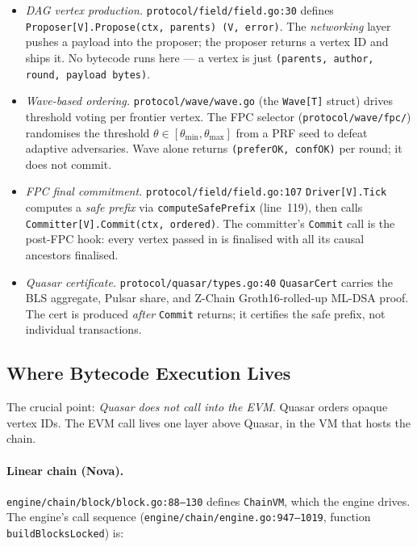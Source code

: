\begin{itemize}
  \item \emph{DAG vertex production.} \texttt{protocol/field/field.go:30}
    defines \texttt{Proposer[V].Propose(ctx, parents) (V, error)}. The
    \emph{networking} layer pushes a payload into the proposer; the
    proposer returns a vertex ID and ships it. No bytecode runs here ---
    a vertex is just \texttt{(parents, author, round, payload bytes)}.
  \item \emph{Wave-based ordering.} \texttt{protocol/wave/wave.go} (the
    \texttt{Wave[T]} struct) drives threshold voting per frontier vertex.
    The FPC selector (\texttt{protocol/wave/fpc/}) randomises the
    threshold $\theta \in [\theta_{\min}, \theta_{\max}]$ from a PRF seed
    to defeat adaptive adversaries. Wave alone returns
    \texttt{(preferOK, confOK)} per round; it does not commit.
  \item \emph{FPC final commitment.} \texttt{protocol/field/field.go:107}
    \texttt{Driver[V].Tick} computes a \emph{safe prefix} via
    \texttt{computeSafePrefix} (line~119), then calls
    \texttt{Committer[V].Commit(ctx, ordered)}. The committer's
    \texttt{Commit} call is the post-FPC hook: every vertex passed in is
    finalised with all its causal ancestors finalised.
  \item \emph{Quasar certificate.} \texttt{protocol/quasar/types.go:40}
    \texttt{QuasarCert} carries the BLS aggregate, Pulsar share, and
    Z-Chain Groth16-rolled-up ML-DSA proof. The cert is produced
    \emph{after} \texttt{Commit} returns; it certifies the safe prefix,
    not individual transactions.
\end{itemize}

\subsection{Where Bytecode Execution Lives}
\label{sec:cevm-pipeline-position}

The crucial point: \emph{Quasar does not call into the EVM}. Quasar orders
opaque vertex IDs. The EVM call lives one layer above Quasar, in the VM
that hosts the chain.

\paragraph{Linear chain (Nova).}
\texttt{engine/chain/block/block.go:88--130} defines \texttt{ChainVM},
which the engine drives. The engine's call sequence
(\texttt{engine/chain/engine.go:947--1019}, function
\texttt{buildBlocksLocked}) is:

